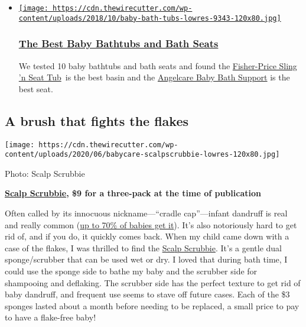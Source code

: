 \begin{itemize}
\item
  \href{https://www.nytimes3xbfgragh.onion/wirecutter/reviews/best-baby-bathtubs-and-bath-seats/}{\texttt{[image: https://cdn.thewirecutter.com/wp-content/uploads/2018/10/baby-bath-tubs-lowres-9343-120x80.jpg]}}

  \hypertarget{the-best-baby-bathtubs-and-bath-seats}{%
  \subsubsection{\texorpdfstring{\href{https://www.nytimes3xbfgragh.onion/wirecutter/reviews/best-baby-bathtubs-and-bath-seats/}{The
  Best Baby Bathtubs and Bath
  Seats}}{The Best Baby Bathtubs and Bath Seats}}\label{the-best-baby-bathtubs-and-bath-seats}}

  We tested 10 baby bathtubs and bath seats and found the
  \href{https://wclink.co/link/28567/148095/4/81527/?merchant=BuyBuy\%20Baby}{Fisher-Price
  Sling 'n Seat Tub}~is the best basin and the
  \href{https://wclink.co/link/28568/162168/4/81529/?merchant=BuyBuy\%20Baby}{Angelcare
  Baby Bath Support} is the best seat.
\end{itemize}

\hypertarget{a-brush-that-fights-the-flakes}{%
\subsection{A brush that fights the
flakes}\label{a-brush-that-fights-the-flakes}}

\texttt{[image: https://cdn.thewirecutter.com/wp-content/uploads/2020/06/babycare-scalpscrubbie-lowres-120x80.jpg]}

Photo: Scalp Scrubbie

\textbf{\href{https://www.nytimes3xbfgragh.onion/wirecutter/out/link/39074/162829/4/115963/?merchant=Amazon}{Scalp
Scrubbie}, \$9 for a three-pack at the time of publication}

Often called by its innocuous nickname---``cradle cap''---infant
dandruff is real and really common
(\href{https://parenting.nytimes3xbfgragh.onion/childrens-health/newborn-body}{up
to 70\% of babies get it}). It's also notoriously hard to get rid of,
and if you do, it quickly comes back. When my child came down with a
case of the flakes, I was thrilled to find the
\href{https://www.nytimes3xbfgragh.onion/wirecutter/out/link/39074/162829/4/115963/?merchant=Amazon}{Sca}\href{https://www.nytimes3xbfgragh.onion/wirecutter/out/link/39074/162829/4/115963/?merchant=Amazon}{lp
Scrubbie}. It's a gentle dual sponge/scrubber that can be used wet or
dry. I loved that during bath time, I could use the sponge side to bathe
my baby and the scrubber side for shampooing and deflaking. The scrubber
side has the perfect texture to get rid of baby dandruff, and frequent
use seems to stave off future cases. Each of the \$3 sponges lasted
about a month before needing to be replaced, a small price to pay to
have a flake-free baby!

